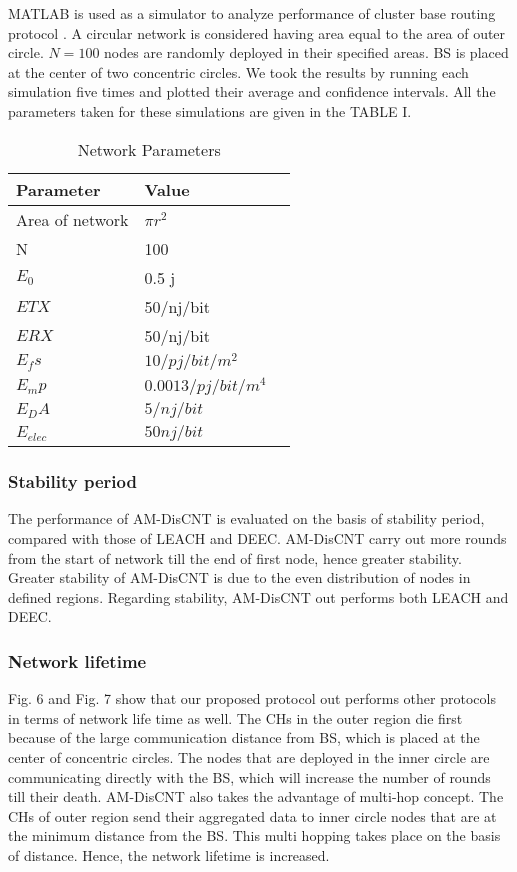 \documentclass[journal]{IEEEtran}
\begin{document}
 MATLAB is used as a simulator to analyze performance of cluster base routing protocol . A circular network is considered having area equal to the area of outer circle. $N=100$ nodes are randomly deployed in their specified areas. BS is placed at the center of two concentric circles. We took the results by running each simulation five times and plotted their average and confidence intervals. All the parameters taken for these simulations are given in the TABLE I.
 \begin{table}[htbp]
  \centering
  \caption{Network Parameters}
  \begin{tabular}[height=9cm,width=9cm]{lll}
    \toprule
    Parameter & Value  &  \\
    \midrule
Area of network          & $\pi r^2$ \\
   N            & 100  \\
  $E_0$          & 0.5 j \\
     $ETX$        & 50/nj/bit \\
     $ERX$       & 50/nj/bit \\
    $E_fs$       & $10/pj/bit/m^2$ \\
    $E_mp$       & $0.0013/pj/bit/m^4$\\
     $E_DA$       & $5/nj/bit$ \\
    $E_{elec}$     & $50nj/bit$ \\
     \bottomrule
 \end{tabular}\label{tab:addlabe2}\end{table}
\subsubsection{Stability period}
The performance of AM-DisCNT is evaluated on the basis of stability period, compared with those of LEACH and DEEC. AM-DisCNT carry out more rounds from the start of network till the end of first node, hence greater  stability. Greater stability of AM-DisCNT is due to the even distribution of nodes in defined regions. Regarding stability, AM-DisCNT out performs both LEACH and DEEC.



\subsubsection{Network lifetime}
 Fig. 6 and Fig. 7 show that our proposed protocol out performs other protocols in terms of network life time as well.  The CHs in the outer region die first because of the large communication distance from BS, which is placed at the center of concentric circles. The nodes that are deployed in the inner circle are communicating directly with the BS, which will increase the number of rounds till their death. AM-DisCNT also takes the advantage of multi-hop concept. The CHs of outer region send their aggregated data to inner circle nodes that are at the minimum distance from the BS. This multi hopping takes place on the basis of distance. Hence, the network lifetime is increased.
\end{document}
